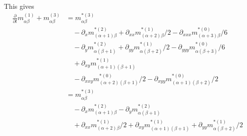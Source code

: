 This gives
\begin{equation}
  \label{eq:third order in epsilon}
  \begin{aligned}
    \frac{\partial}{\partial t} m_{\alpha\beta}^{(1)} + m_{\alpha\beta}^{(3)}
    & =  m_{\alpha\beta}^{*(3)} \\
    &\quad - \partial_x m_{(\alpha+1)\beta}^{*(2)} + \partial_{xx} m_{(\alpha+2)\beta}^{*(1)}/2 - \partial_{xxx} m_{(\alpha+3)\beta}^{*(0)}/6 \\
    &\quad - \partial_y m_{\alpha(\beta+1)}^{*(2)} + \partial_{yy} m_{\alpha(\beta+2)}^{*(1)}/2 - \partial_{yyy} m_{\alpha(\beta+3)}^{*(0)}/6 \\
    &\quad + \partial_{xy} m_{(\alpha+1)(\beta+1)}^{*(1)} \\
    &\quad - \partial_{xxy} m_{(\alpha+2)(\beta+1)}^{*(0)}/2 - \partial_{xyy} m_{(\alpha+1)(\beta+2)}^{*(0)}/2 \\
    & =  m_{\alpha\beta}^{*(3)} \\
    &\quad - \partial_x m_{(\alpha+1)\beta}^{*(2)} - \partial_y m_{\alpha(\beta+1)}^{*(2)}  \\
    &\quad  + \partial_{xx} m_{(\alpha+2)\beta}^{*(1)}/2 + \partial_{xy} m_{(\alpha+1)(\beta+1)}^{*(1)} + \partial_{yy} m_{\alpha(\beta+2)}^{*(1)}/2
  \end{aligned}
\end{equation}

